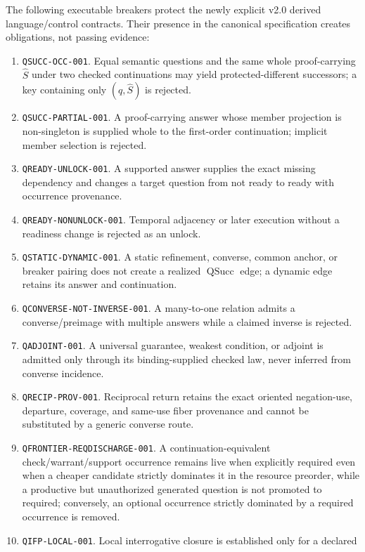 \documentclass[11pt,oneside]{article}
\newcommand{\QSucc}{\operatorname{QSucc}}
\begin{document}
The following executable breakers protect the newly explicit v2.0 derived language/control
contracts.  Their presence in the canonical specification creates obligations, not passing evidence:
\begin{enumerate}
\item \texttt{QSUCC-OCC-001}. Equal semantic questions and the same whole proof-carrying
      \(\widehat S\) under two checked continuations may yield protected-different successors; a key
      containing only \((q,\widehat S)\) is rejected.
\item \texttt{QSUCC-PARTIAL-001}. A proof-carrying answer whose member projection is non-singleton is
      supplied whole to the first-order continuation; implicit member selection is rejected.
\item \texttt{QREADY-UNLOCK-001}. A supported answer supplies the exact missing dependency and
      changes a target question from not ready to ready with occurrence provenance.
\item \texttt{QREADY-NONUNLOCK-001}. Temporal adjacency or later execution without a readiness
      change is rejected as an unlock.
\item \texttt{QSTATIC-DYNAMIC-001}. A static refinement, converse, common anchor, or breaker pairing
      does not create a realized \(\QSucc\) edge; a dynamic edge retains its answer and continuation.
\item \texttt{QCONVERSE-NOT-INVERSE-001}. A many-to-one relation admits a converse/preimage with
      multiple answers while a claimed inverse is rejected.
\item \texttt{QADJOINT-001}. A universal guarantee, weakest condition, or adjoint is admitted only
      through its binding-supplied checked law, never inferred from converse incidence.
\item \texttt{QRECIP-PROV-001}. Reciprocal return retains the exact oriented negation-use,
      departure, coverage, and same-use fiber provenance and cannot be substituted by a generic
      converse route.
\item \texttt{QFRONTIER-REQDISCHARGE-001}. A continuation-equivalent check/warrant/support
      occurrence remains live when explicitly required even when a cheaper candidate strictly
      dominates it in the resource preorder, while a productive but unauthorized generated question
      is not promoted to required; conversely, an optional occurrence strictly dominated by a
      required occurrence is removed.
\item \texttt{QIFP-LOCAL-001}. Local interrogative closure is established only for a declared

\end{enumerate}
\end{document}
